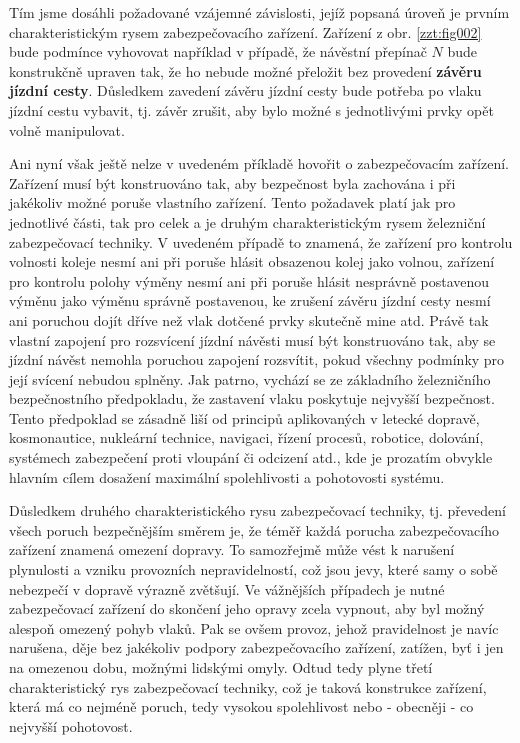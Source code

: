   Tím jsme dosáhli požadované vzájemné závislosti, jejíž popsaná úroveň je prvním charakteristickým 
  rysem zabezpečovacího zařízení. Zařízení z obr. \ref{zzt:fig002} bude podmínce vyhovovat 
  například v případě, že návěstní přepínač \(N\) bude konstrukčně upraven tak, že ho nebude možné 
  přeložit bez provedení \textbf{závěru jízdní cesty}. Důsledkem zavedení závěru jízdní cesty bude 
  potřeba po vlaku jízdní cestu vybavit, tj. závěr zrušit, aby bylo možné s jednotlivými prvky opět 
  volně manipulovat. 

  Ani nyní však ještě nelze v uvedeném příkladě hovořit o zabezpečovacím zařízení. Zařízení musí
  být konstruováno tak, aby bezpečnost byla zachována i při jakékoliv možné poruše vlastního 
  zařízení. Tento  požadavek platí jak pro jednotlivé části, tak pro celek a je druhým 
  charakteristickým rysem železniční zabezpečovací techniky. V uvedeném případě to znamená, že 
  zařízení pro kontrolu volnosti koleje nesmí ani při poruše hlásit obsazenou kolej jako volnou, 
  zařízení pro kontrolu polohy výměny nesmí ani při poruše hlásit nesprávně postavenou výměnu jako 
  výměnu správně postavenou, ke zrušení závěru jízdní cesty nesmí ani poruchou dojít dříve než vlak 
  dotčené prvky skutečně mine atd. Právě tak vlastní zapojení pro rozsvícení jízdní návěsti musí 
  být konstruováno tak, aby se jízdní návěst nemohla poruchou zapojení rozsvítit, pokud všechny 
  podmínky pro její svícení nebudou splněny. Jak patrno, vychází se ze základního železničního
  bezpečnostního předpokladu, že zastavení vlaku poskytuje nejvyšší bezpečnost. Tento předpoklad se 
  zásadně liší od principů aplikovaných v letecké dopravě, kosmonautice, nukleární technice, 
  navigaci, řízení procesů, robotice, dolování, systémech zabezpečení proti vloupání či odcizení 
  atd., kde je prozatím obvykle hlavním cílem dosažení maximální spolehlivosti a pohotovosti 
  systému.
  
  Důsledkem druhého charakteristického rysu zabezpečovací techniky, tj. převedení všech poruch
  bezpečnějším směrem je, že téměř každá porucha zabezpečovacího zařízení znamená omezení dopravy. 
  To samozřejmě může vést k narušení plynulosti a vzniku provozních nepravidelností, což jsou jevy, 
  které samy o sobě nebezpečí v dopravě výrazně zvětšují. Ve vážnějších případech je nutné 
  zabezpečovací zařízení do skončení jeho opravy zcela vypnout, aby byl možný alespoň omezený pohyb 
  vlaků. Pak se ovšem provoz, jehož pravidelnost je navíc narušena, děje bez jakékoliv podpory 
  zabezpečovacího zařízení, zatížen, byť i jen na omezenou dobu, možnými lidskými omyly. Odtud tedy 
  plyne třetí charakteristický rys zabezpečovací techniky, což je taková konstrukce zařízení, která 
  má co nejméně poruch, tedy vysokou spolehlivost nebo - obecněji - co nejvyšší pohotovost. 
 

